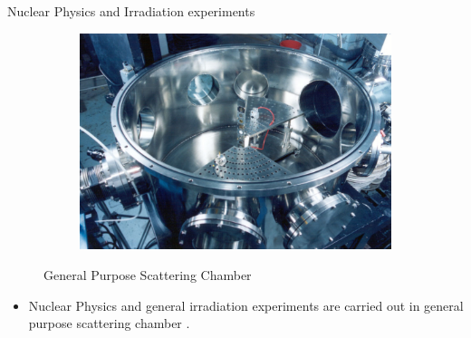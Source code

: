 \documentclass[11pt]{beamer}
\begin{document}
\begin{frame}{Nuclear Physics and Irradiation experiments}

  \begin{figure}
        \centering
        \begin{subfigure}[b]{0.5\textwidth}
                \includegraphics[width=\textwidth]{Scattering_chamber.jpg}
        \end{subfigure}%
               
        \caption{General Purpose Scattering Chamber}\label{fig:Scattering Chamber}
\end{figure}
  
  
  \begin{itemize}
    
    \item Nuclear Physics and general irradiation experiments are carried out in general purpose scattering chamber . 
			           
   \end{itemize}


\end{frame}
\end{document}
